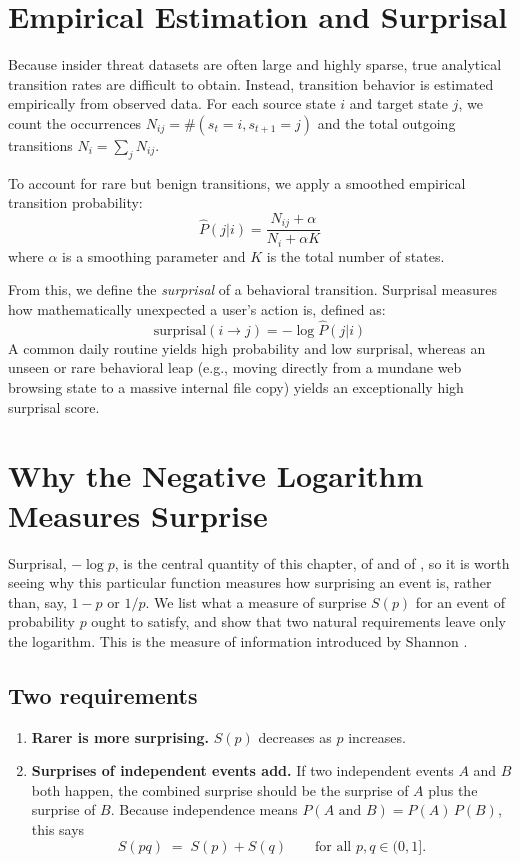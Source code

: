 \section{Empirical Estimation and Surprisal}
Because insider threat datasets are often large and highly sparse, true analytical transition rates are difficult to obtain. Instead, transition behavior is estimated empirically from observed data. For each source state $i$ and target state $j$, we count the occurrences $N_{ij} = \#(s_t = i, s_{t+1} = j)$ and the total outgoing transitions $N_i = \sum_j N_{ij}$.

To account for rare but benign transitions, we apply a smoothed empirical transition probability:
$$ \hat{P}(j|i) = \frac{N_{ij} + \alpha}{N_i + \alpha K} $$
where $\alpha$ is a smoothing parameter and $K$ is the total number of states.

From this, we define the \textit{surprisal} of a behavioral transition. Surprisal measures how mathematically unexpected a user's action is, defined as:
$$ \text{surprisal}(i \rightarrow j) = -\log \hat{P}(j|i) $$
A common daily routine yields high probability and low surprisal, whereas an unseen or rare behavioral leap (e.g., moving directly from a mundane web browsing state to a massive internal file copy) yields an exceptionally high surprisal score.

\section{Why the Negative Logarithm Measures Surprise}
\label{sec:why-log}
Surprisal, $-\log p$, is the central quantity of this chapter, of  and of , so
it is worth seeing why this particular function measures how surprising an event is, rather
than, say, $1-p$ or $1/p$. We list what a measure of surprise $S(p)$ for an event of
probability $p$ ought to satisfy, and show that two natural requirements leave only the
logarithm. This is the measure of information introduced by Shannon \cite{shannon1948}.

\subsection{Two requirements}
\begin{enumerate}
\item[(R1)] \textbf{Rarer is more surprising.} $S(p)$ decreases as $p$ increases.
\item[(R2)] \textbf{Surprises of independent events add.} If two independent events $A$ and
$B$ both happen, the combined surprise should be the surprise of $A$ plus the surprise of $B$.
Because independence means $P(A \text{ and } B) = P(A)\,P(B)$, this says
\begin{equation}
S(pq) \;=\; S(p) + S(q) \qquad \text{for all } p, q \in (0, 1].
\label{eq:surprise-additive}
\end{equation}
\end{enumerate}

